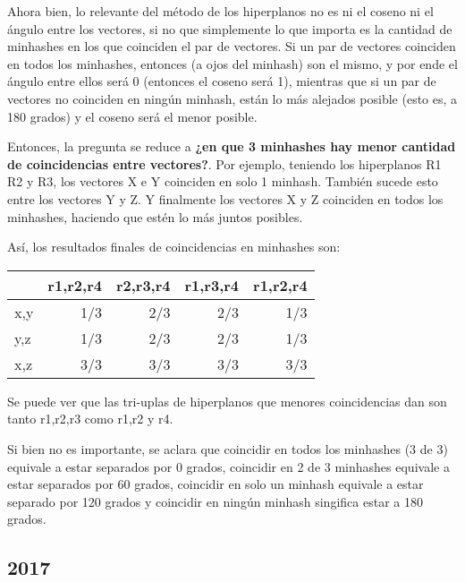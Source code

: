 \documentclass[a4paper]{article}
\begin{document}
    Ahora bien, lo relevante del método de los hiperplanos no es ni el coseno ni el ángulo entre los vectores, si no que simplemente lo que importa es la cantidad de minhashes en los que coinciden el par de vectores. Si un par de vectores coinciden en todos los minhashes, entonces (a ojos del minhash) son el mismo, y por ende el ángulo entre ellos será 0 (entonces el coseno será 1), mientras que si un par de vectores no coinciden en ningún minhash, están lo más alejados posible (esto es, a 180 grados) y el coseno será el menor posible.

    Entonces, la pregunta se reduce a \textbf{¿en que 3 minhashes hay menor cantidad de coincidencias entre vectores?}. Por ejemplo, teniendo los hiperplanos R1 R2 y R3, los vectores X e Y coinciden en solo 1 minhash. También sucede esto entre los vectores Y y Z. Y finalmente los vectores X y Z coinciden en todos los minhashes, haciendo que estén lo más juntos posibles.

    Así, los resultados finales de coincidencias en minhashes son:

    \begin{table}[H]
        \begin{tabular}{|l|r|r|r|r|}
            \hline
            & r1,r2,r4 & r2,r3,r4 & r1,r3,r4 & r1,r2,r4 \\
            \hline
        x,y & 1/3      & 2/3      & 2/3      & 1/3      \\
        y,z & 1/3      & 2/3      & 2/3      & 1/3      \\
        x,z & 3/3      & 3/3      & 3/3      & 3/3     \\
        \hline
        \end{tabular}
    \end{table}
    
    Se puede ver que las tri-uplas de hiperplanos que menores coincidencias dan son tanto r1,r2,r3 como r1,r2 y r4.
    
    Si bien no es importante, se aclara que coincidir en todos los minhashes (3 de 3) equivale a estar separados por 0 grados, coincidir en 2 de 3 minhashes equivale a estar separados por 60 grados, coincidir en solo un minhash equivale a estar separado por 120 grados y coincidir en ningún minhash singifica estar a 180 grados.   

    \subsection{2017}
\end{document}
